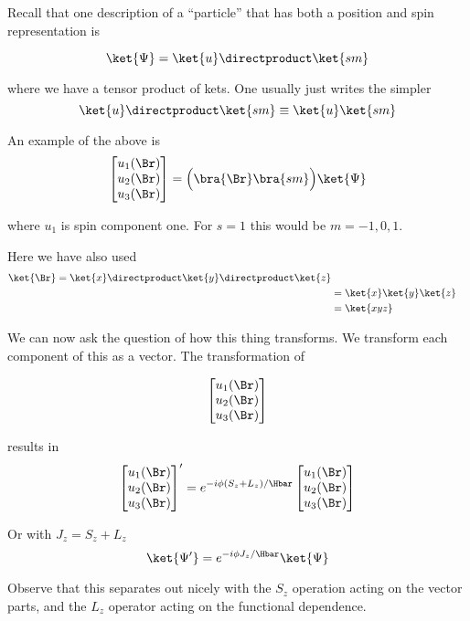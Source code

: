 Recall that one description of a ``particle'' that has both a position and spin representation is

\begin{equation}\label{eqn:PHY356FDec7:190}
\ket{\Psi} = \ket{u} \directproduct \ket{s m}
\end{equation}

where we have a tensor product of kets.  One usually just writes the simpler
\begin{equation}\label{eqn:PHY356FDec7:195}
\ket{u} \directproduct \ket{s m} \equiv \ket{u} \ket{s m}
\end{equation}

An example of the above is
\begin{equation}\label{eqn:PHY356FDec7:200}
\begin{bmatrix}
u_1(\Br) \\
u_2(\Br) \\
u_3(\Br) \\
\end{bmatrix}
= \Bigl( \bra{\Br} \bra{ s m} \Bigr) \ket{\Psi}
\end{equation}

where \(u_1\) is spin component one.  For \(s=1\) this would be \(m=-1, 0, 1\).

Here we have also used
\begin{equation}\label{eqn:lecture12rotationsAndAngularMomentum:340}
\begin{aligned}
\ket{\Br}
=
\ket{x}
\directproduct
\ket{y}
\directproduct
\ket{z} \\
&=
\ket{x}
\ket{y}
\ket{z} \\
&=
\ket{x y z}
\end{aligned}
\end{equation}

We can now ask the question of how this thing transforms.  We transform each component of this as a vector.  The transformation of

\begin{equation}\label{eqn:lecture12rotationsAndAngularMomentum:360}
\begin{aligned}
\begin{bmatrix}
u_1(\Br) \\
u_2(\Br) \\
u_3(\Br)
\end{bmatrix}
\end{aligned}
\end{equation}

results in
\begin{equation}\label{eqn:PHY356FDec7:210}
{\begin{bmatrix}
u_1(\Br) \\
u_2(\Br) \\
u_3(\Br)
\end{bmatrix}}'
=
e^{ -i \phi (S_z + L_z)/\Hbar }
\begin{bmatrix}
u_1(\Br) \\
u_2(\Br) \\
u_3(\Br)
\end{bmatrix}
\end{equation}

Or with \(J_z = S_z + L_z\)
\begin{equation}\label{eqn:PHY356FDec7:220}
\ket{\Psi'} = e^{-i \phi J_z/\Hbar } \ket{\Psi}
\end{equation}

Observe that this separates out nicely with the \(S_z\) operation acting on the vector parts, and the \(L_z\) operator acting on the functional dependence.
